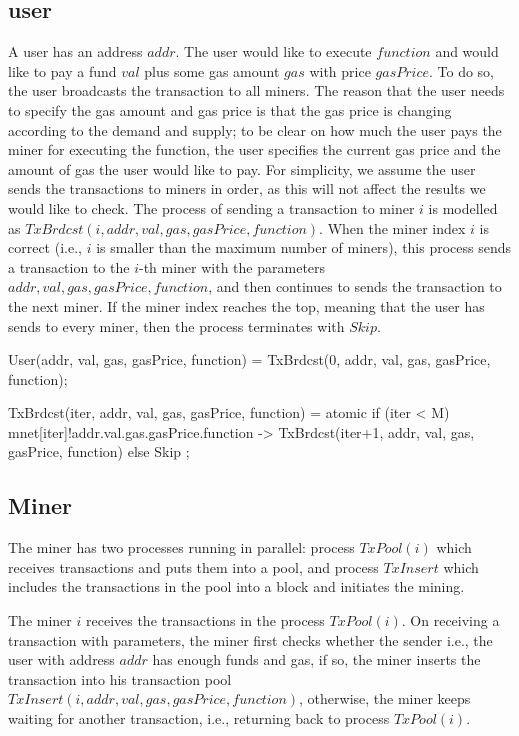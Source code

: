 \documentclass{KERauth}
\begin{document}
\subsection{user}\label{sec:user}
A user has an address $addr$. The user would like to execute $function$ and would like to pay a fund $val$ plus some gas amount $gas$ with price $gasPrice$. To do so, the user broadcasts the transaction to all miners. The reason that the user needs to specify the gas amount and gas price is that the gas price is changing according to the demand and supply; to be clear on how much the user pays the miner for executing the function, the user specifies the current gas price and the amount of gas the user would like to pay.
For simplicity, we assume the user sends the transactions to miners in order, as this will not affect the results we would like to check. The process of sending a transaction to miner $i$ is modelled as $TxBrdcst(i, addr, val, gas, gasPrice, function)$. When the miner index $i$ is correct (i.e., $i$ is smaller than the maximum number of miners), this process sends a transaction to the $i$-th miner with the parameters $addr, val, gas, gasPrice, function$, and then continues to sends the transaction to the next miner. If the miner index reaches the top, meaning that the user has sends to every miner, then the process terminates with $Skip$.

\begin{center}
\begin{boxedverbatim}
User(addr, val, gas, gasPrice, function) =
            TxBrdcst(0, addr, val, gas, gasPrice, function);

TxBrdcst(iter, addr, val, gas, gasPrice, function) =
  atomic{
    if (iter < M) {
      mnet[iter]!addr.val.gas.gasPrice.function ->
      TxBrdcst(iter+1, addr, val, gas, gasPrice, function) }
    else {
      Skip } };
\end{boxedverbatim}
\end{center}

\subsection{Miner}\label{sec:miner}

The miner has two processes running in parallel: process $TxPool(i)$ which receives transactions and puts them into a pool, and process $TxInsert$ which includes the transactions in the pool into a block and initiates the mining.

The miner $i$ receives the transactions in the process $TxPool(i)$. On receiving a transaction with parameters, the miner first checks whether the sender i.e., the user with address $addr$ has enough funds and gas, if so, the miner inserts the transaction into his transaction pool $TxInsert(i, addr, val, gas, gasPrice, function)$, otherwise, the miner keeps waiting for another transaction, i.e., returning back to process $TxPool(i)$.
\end{document}
